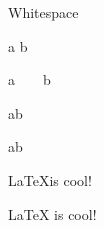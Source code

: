 \copyrightVincent
\copyrightTim

\begin{frame}[fragile]{Whitespace}
    \setlength\atleastlength{15em}
    \begin{noindentlist}
        \item<+-> a b

        \item<+-> a\ \ \ \ b

        \item<+-> a\quad b

        \item<+-> a\hspace{2cm}b
        
        \item<+-> \LaTeX is cool!
     
        \item<+-> \LaTeX{} is cool!
    \end{noindentlist}
\end{frame}

